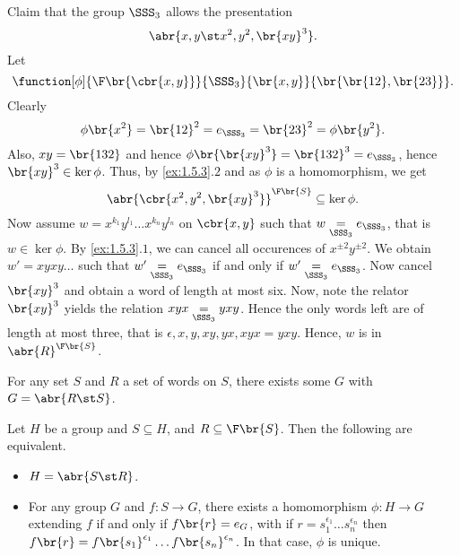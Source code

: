 \begin{example}
Claim that the group $ \SSS_3 $ allows the presentation
$$ \abr{x, y \st x^2, y^2, \br{xy}^3}. $$
Let
$$ \function[\phi]{\F\br{\cbr{x, y}}}{\SSS_3}{\br{x, y}}{\br{\br{12}, \br{23}}}. $$
Clearly
$$ \phi\br{x^2} = \br{12}^2 = e_{\SSS_3} = \br{23}^2 = \phi\br{y^2}. $$
Also, $ xy = \br{132} $ and hence $ \phi\br{\br{xy}^3} = \br{132}^3 = e_{\SSS_3} $, hence $ \br{xy}^3 \in \ker \phi $. Thus, by \ref{ex:1.5.3}.$ 2 $ and as $ \phi $ is a homomorphism, we get
$$ \abr{\cbr{x^2, y^2, \br{xy}^3}}^{\F\br{S}} \subseteq \ker \phi. $$
Now assume $ w = x^{k_1}y^{l_1} \dots x^{k_n}y^{l_n} $ on $ \cbr{x, y} $ such that $ w \underset{\SSS_3}{=} e_{\SSS_3} $, that is $ w \in \ker \phi $. By \ref{ex:1.5.3}.$ 1 $, we can cancel all occurences of $ x^{\pm 2}y^{\pm 2} $. We obtain $ w' = xyxy \dots $ such that $ w' \underset{\SSS_3}{=} e_{\SSS_3} $ if and only if $ w' \underset{\SSS_3}{=} e_{\SSS_3} $. Now cancel $ \br{xy}^3 $ and obtain a word of length at most six. Now, note the relator $ \br{xy}^3 $ yields the relation $ xyx \underset{\SSS_3}{=} yxy $. Hence the only words left are of length at most three, that is $ \epsilon, x, y, xy, yx, xyx = yxy $. Hence, $ w $ is in $ \abr{R}^{\F\br{S}} $.
\end{example}

\pagebreak

\begin{exercise}
For any set $ S $ and $ R $ a set of words on $ S $, there exists some $ G $ with $ G = \abr{R \st S} $.
\end{exercise}

\begin{proposition}
Let $ H $ be a group and $ S \subseteq H $, and $ R \subseteq \F\br{S} $. Then the following are equivalent.
\begin{itemize}
\item $ H = \abr{S \st R} $.
\item For any group $ G $ and $ f : S \to G $, there exists a homomorphism $ \phi : H \to G $ extending $ f $ if and only if $ f\br{r} = e_G $, with if $ r = s_1^{\epsilon_1} \dots s_n^{\epsilon_n} $ then $ f\br{r} = f\br{s_1}^{\epsilon_1} \dots f\br{s_n}^{\epsilon_n} $. In that case, $ \phi $ is unique.
\end{itemize}
\end{proposition}

